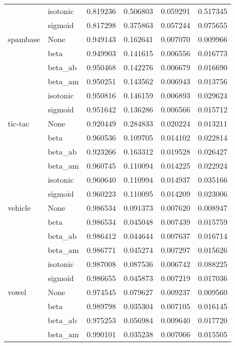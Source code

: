 \begin{tabular}{llrrrr}
        & isotonic &  0.819236 &  0.506803 &  0.059291 &  0.517345 \\
        & sigmoid &  0.817298 &  0.375863 &  0.057244 &  0.075655 \\
spambase & None &  0.949143 &  0.162641 &  0.007070 &  0.009966 \\
        & beta &  0.949903 &  0.141615 &  0.006556 &  0.016773 \\
        & beta\_ab &  0.950468 &  0.142276 &  0.006679 &  0.016690 \\
        & beta\_am &  0.950251 &  0.143562 &  0.006943 &  0.013756 \\
        & isotonic &  0.950816 &  0.146159 &  0.006893 &  0.029624 \\
        & sigmoid &  0.951642 &  0.136286 &  0.006566 &  0.015712 \\
tic-tac & None &  0.920449 &  0.284833 &  0.020224 &  0.013211 \\
        & beta &  0.960536 &  0.109705 &  0.014102 &  0.022814 \\
        & beta\_ab &  0.923266 &  0.163312 &  0.019528 &  0.026427 \\
        & beta\_am &  0.960745 &  0.110094 &  0.014225 &  0.022924 \\
        & isotonic &  0.960640 &  0.110994 &  0.014937 &  0.035166 \\
        & sigmoid &  0.960223 &  0.110095 &  0.014209 &  0.023006 \\
vehicle & None &  0.986534 &  0.091373 &  0.007620 &  0.008947 \\
        & beta &  0.986534 &  0.045048 &  0.007439 &  0.015759 \\
        & beta\_ab &  0.986412 &  0.044644 &  0.007637 &  0.016714 \\
        & beta\_am &  0.986771 &  0.045274 &  0.007297 &  0.015626 \\
        & isotonic &  0.987008 &  0.087536 &  0.006742 &  0.088225 \\
        & sigmoid &  0.986655 &  0.045873 &  0.007219 &  0.017036 \\
vowel & None &  0.974545 &  0.079627 &  0.009237 &  0.009560 \\
        & beta &  0.989798 &  0.035304 &  0.007105 &  0.016145 \\
        & beta\_ab &  0.975253 &  0.056984 &  0.009640 &  0.017720 \\
        & beta\_am &  0.990101 &  0.035238 &  0.007066 &  0.015505 \\

\end{tabular}
